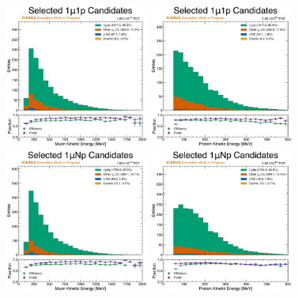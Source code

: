 \begin{figure}[!htb]
    \centering
    \includegraphics[width=0.42\textwidth]{figures/neutrino_selection/selected_hist1d_1mu1p_muon_ke.pdf}
    \includegraphics[width=0.42\textwidth]{figures/neutrino_selection/selected_hist1d_1mu1p_proton_ke.pdf}
    \\
    \includegraphics[width=0.42\textwidth]{figures/neutrino_selection/selected_hist1d_1muNp_muon_ke.pdf}
    \includegraphics[width=0.42\textwidth]{figures/neutrino_selection/selected_hist1d_1muNp_proton_ke.pdf}

\end{figure}
